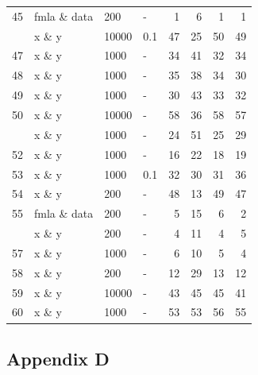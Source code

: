 \begin{Schunk}
\begin{table}
\begin{tabular}[t]{rlllrrrr}
45 & fmla \& data & 200 & - & 1 & 6 & 1 & 1\\
\addlinespace
46 & x \& y & 10000 & 0.1 & 47 & 25 & 50 & 49\\
47 & x \& y & 1000 & - & 34 & 41 & 32 & 34\\
48 & x \& y & 1000 & - & 35 & 38 & 34 & 30\\
49 & x \& y & 1000 & - & 30 & 43 & 33 & 32\\
50 & x \& y & 10000 & - & 58 & 36 & 58 & 57\\
\addlinespace
51 & x \& y & 1000 & - & 24 & 51 & 25 & 29\\
52 & x \& y & 1000 & - & 16 & 22 & 18 & 19\\
53 & x \& y & 1000 & 0.1 & 32 & 30 & 31 & 36\\
54 & x \& y & 200 & - & 48 & 13 & 49 & 47\\
55 & fmla \& data & 200 & - & 5 & 15 & 6 & 2\\
\addlinespace
56 & x \& y & 200 & - & 4 & 11 & 4 & 5\\
57 & x \& y & 1000 & - & 6 & 10 & 5 & 4\\
58 & x \& y & 200 & - & 12 & 29 & 13 & 12\\
59 & x \& y & 10000 & - & 43 & 45 & 45 & 41\\
60 & x \& y & 1000 & - & 53 & 53 & 56 & 55\\
\bottomrule
\end{tabular}
\end{table}

\end{Schunk}

\hypertarget{appendix-d}{%
\subsection{Appendix D}\label{appendix-d}}

